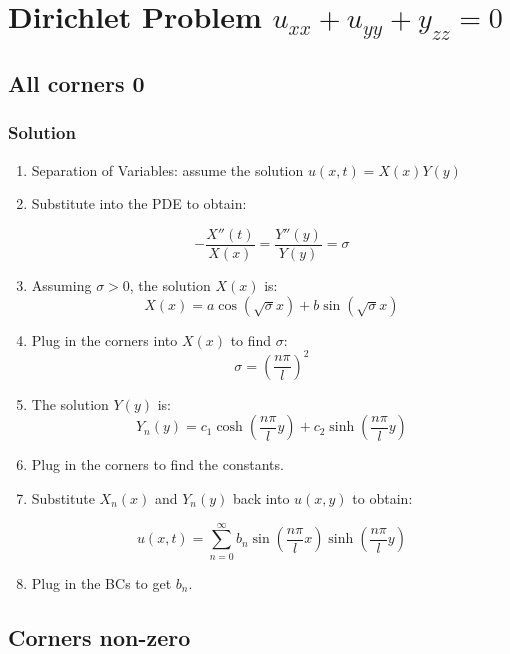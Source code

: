 \documentclass[11pt]{article}
\begin{document}
\section{Dirichlet Problem $u_{xx}+u_{yy}+y_{zz}=0$}
 
\subsection{All corners 0}
\subsubsection*{Solution}
\begin{enumerate}

\item Separation of Variables: assume the solution $u(x,t) = X(x)Y(y)$
\item Substitute into the PDE to obtain:

$$ -\frac{X''(t)}{X(x)} = \frac{Y''(y)}{Y(y)} = \sigma $$

\item Assuming $\sigma > 0$,  the solution $X(x)$ is:
$$ X(x) = a\cos(\sqrt{\sigma}x) + b\sin(\sqrt{\sigma}x) $$

\item Plug in the corners into $X(x)$ to find $\sigma$:
$$ \sigma = (\frac{n\pi}{l})^2 $$

\item The solution $Y(y)$ is:
$$ Y_n(y) = c_1\cosh(\frac{n\pi}{l}y) + c_2\sinh(\frac{n\pi}{l}y) $$

\item Plug in the corners to find the constants.

\item Substitute $X_n(x)$ and $Y_n(y)$ back into $u(x,y)$ to obtain:

$$ u(x,t) = \sum \limits_{n=0}^{\infty} b_n\sin(\frac{n\pi}{l}x) \sinh(\frac{n\pi}{l}y) $$

\item Plug in the BCs to get $b_n$.
\end{enumerate}

\subsection{Corners non-zero}
\end{document}
